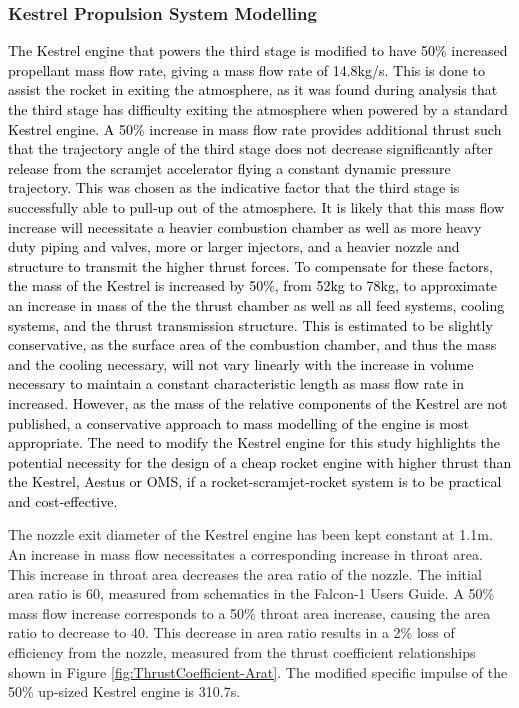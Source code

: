 		\subsubsection{Kestrel Propulsion System Modelling}
			\textcolor{black}{
		The Kestrel engine that powers the third stage is modified to have 50\% increased propellant mass flow rate, giving a mass flow rate of 14.8kg/s. This is done to assist the rocket in exiting the atmosphere, as it was found during analysis that the third stage has difficulty exiting the atmosphere when powered by a standard Kestrel engine. A 50\% increase in mass flow rate provides additional thrust such that the trajectory angle of the third stage does not decrease significantly after release from the scramjet accelerator flying a constant dynamic pressure trajectory. This was chosen as the indicative factor that the third stage is successfully able to pull-up out of the atmosphere. It is likely that this mass flow increase will necessitate a heavier combustion chamber as well as more heavy duty piping and valves, more or larger injectors, and a heavier nozzle and structure to transmit the higher thrust forces\cite{RPE,Huzel1967}. To compensate for these factors, the mass of the Kestrel is increased by 50\%, from 52kg\cite{Wade2017} to 78kg, to approximate an increase in mass of the the thrust chamber as well as all feed systems, cooling systems, and the thrust transmission structure. This is estimated to be slightly conservative, as the surface area of the combustion chamber, and thus the mass and the cooling necessary, will not vary linearly with the increase in volume necessary to maintain a constant characteristic length as mass flow rate in increased\cite{RPE,Huzel1967}. However, as the mass of the relative components of the Kestrel are not published, a conservative approach to mass modelling of the engine is most appropriate. The need to modify the Kestrel engine for this study highlights the potential necessity for the design of a cheap rocket engine with higher thrust than the Kestrel, Aestus or OMS, if a rocket-scramjet-rocket system is to be practical and cost-effective.}
		
		
		
		The nozzle exit diameter of the Kestrel engine has been kept constant at 1.1m. An increase in mass flow necessitates a corresponding increase in throat area. This increase in throat area decreases the area ratio of the nozzle. The initial area ratio is 60, measured from schematics in the Falcon-1 Users Guide. A 50\% mass flow increase corresponds to a 50\% throat area increase, causing the area ratio to decrease to 40. This decrease in area ratio results in a 2\% loss of efficiency from the nozzle, measured from the thrust coefficient relationships shown in Figure \ref{fig:ThrustCoefficient-Arat}\cite{RPE}. The modified specific impulse of the 50\% up-sized Kestrel engine is 310.7s. 
		
